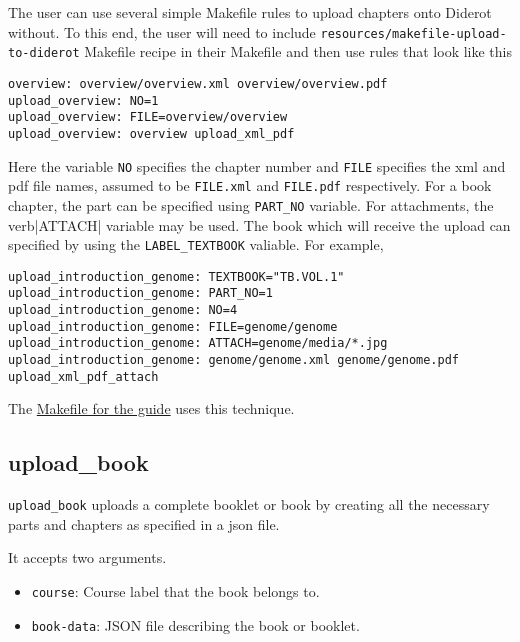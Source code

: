 \begin{gram}
The user can use several simple Makefile rules to upload chapters onto
Diderot without.  To this end, the user will need to include
\verb|resources/makefile-upload-to-diderot| Makefile recipe in their
Makefile and then use rules that look like this
\begin{verbatim}
overview: overview/overview.xml overview/overview.pdf
upload_overview: NO=1
upload_overview: FILE=overview/overview
upload_overview: overview upload_xml_pdf
\end{verbatim}

Here the variable \verb|NO| specifies the chapter number and \verb|FILE| specifies the xml and pdf file names, assumed to be \verb|FILE.xml| and \verb|FILE.pdf| respectively.  
%
For a book chapter, the part can be specified using \verb|PART_NO| variable.
%
For attachments, the verb|ATTACH| variable may be used.
%
The book which will receive the upload can specified by using the \verb|LABEL_TEXTBOOK| valiable.
For example,

\begin{verbatim}
upload_introduction_genome: TEXTBOOK="TB.VOL.1"
upload_introduction_genome: PART_NO=1 
upload_introduction_genome: NO=4
upload_introduction_genome: FILE=genome/genome
upload_introduction_genome: ATTACH=genome/media/*.jpg 
upload_introduction_genome: genome/genome.xml genome/genome.pdf upload_xml_pdf_attach
\end{verbatim}
\end{gram}

\begin{gram}
The \href{file://cli/attachments/Makefile-guide}{Makefile for the guide} uses this technique.

\end{gram}

\subsection{upload\_book}

\begin{gram}
\verb|upload_book| uploads a complete booklet or book by creating all the necessary parts and chapters as specified in a json file.

It accepts two arguments.
%
\begin{itemize}
  \item \verb|course|: Course label that the book belongs to.
  \item \verb|book-data|: JSON file describing the book or booklet.
\end{itemize}
\end{gram}

